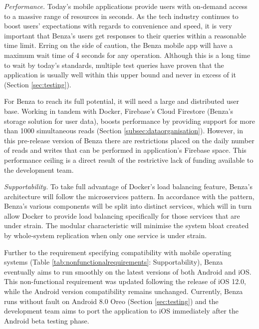 \documentclass{article}
\begin{document}
    \emph{Performance.} Today's mobile applications provide users with on-demand access to a massive range of resources in seconds. As the tech industry continues to boost users' expectations with regards to convenience and speed, it is very important that Benza's users get responses to their queries within a reasonable time limit. Erring on the side of caution, the Benza mobile app will have a maximum wait time of 4 seconds for any operation. Although this is a long time to wait by today's standards, multiple test queries have proven that the application is usually well within this upper bound and never in excess of it (Section \ref{sec:testing}). \par
    
    For Benza to reach its full potential, it will need a large and distributed user base. Working in tandem with Docker, Firebase's Cloud Firestore (Benza's storage solution for user data), boosts performance by providing support for more than 1000 simultaneous reads (Section \ref{subsec:dataorganisation}). However, in this pre-release version of Benza there are restrictions placed on the daily number of reads and writes that can be performed in application's Firebase space. This performance ceiling is a direct result of the restrictive lack of funding available to the development team. \par
    
    \emph{Supportability.} To take full advantage of Docker's load balancing feature, Benza's architecture will follow the \glspl{microservice} pattern. In accordance with the pattern, Benza's various components will be split into distinct services, which will in turn allow Docker to provide load balancing specifically for those services that are under strain. The modular characteristic will minimise the system bloat created by whole-system replication when only one service is under strain. \par
    
    Further to the requirement specifying compatibility with mobile operating systems (Table \ref{tab:nonfunctionalrequirements}: Supportability), Benza eventually aims to run smoothly on the latest versions of both Android and iOS. This non-functional requirement was updated following the release of iOS 12.0, while the Android version compatibility remains unchanged. Currently, Benza runs without fault on Android 8.0 Oreo (Section \ref{sec:testing}) and the development team aims to port the application to iOS immediately after the Android beta testing phase. \par
    
\end{document}
